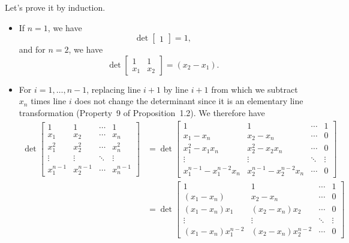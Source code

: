\begin{solution}
  Let's prove it by induction.
  \begin{itemize}
    \item If $n = 1$, we have
      \[
        \det
        \begin{bmatrix}
          1
        \end{bmatrix}
        = 1,
      \]
      and for $n = 2$, we have
      \[
        \det
        \begin{bmatrix}
          1 & 1\\
          x_1 & x_2
        \end{bmatrix}
        = (x_2 - x_1).
      \]
    \item
      For $i = 1, \ldots, n-1$, replacing line $i+1$
      by line $i+1$ from which we subtract $x_n$ times line $i$
      does not change the determinant since
      it is an elementary line transformation (Property~9 of Proposition~1.2).
      We therefore have
      \begin{align*}
        \det
        \begin{bmatrix}
          1 & 1 & \cdots & 1\\
          x_1 & x_2 & \cdots & x_n\\
          x_1^2 & x_2^2 & \cdots & x_n^2\\
          \vdots & \vdots & \ddots & \vdots\\
          x_1^{n-1} & x_2^{n-1} & \cdots & x_n^{n-1}
        \end{bmatrix}
        & =
        \det
        \begin{bmatrix}
          1 & 1 & \cdots & 1\\
          x_1-x_n & x_2-x_n & \cdots & 0\\
          x_1^2-x_1x_n & x_2^2 - x_2x_n & \cdots & 0\\
          \vdots & \vdots & \ddots & \vdots\\
          x_1^{n-1}-x_1^{n-2}x_n & x_2^{n-1}-x_2^{n-2}x_n & \cdots & 0
        \end{bmatrix}\\
        & =
        \det
        \begin{bmatrix}
          1 & 1 & \cdots & 1\\
          (x_1-x_n) & x_2-x_n & \cdots & 0\\
          (x_1-x_n)x_1 & (x_2-x_n)x_2 & \cdots & 0\\
          \vdots & \vdots & \ddots & \vdots\\
          (x_1-x_n)x_1^{n-2} & (x_2-x_n)x_2^{n-2} & \cdots & 0

\end{bmatrix}
\end{align*}
\end{itemize}
\end{solution}
